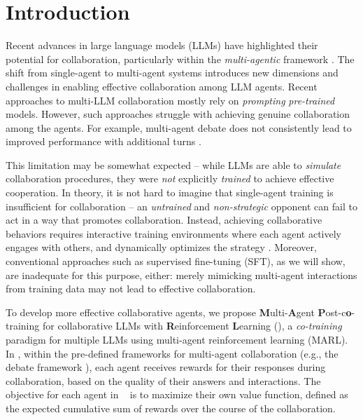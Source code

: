 \safevspace{-4mm}
\section{Introduction}




\safevspace{-2.2mm}
Recent advances in large language models (LLMs) have highlighted their potential for collaboration, particularly within the {\it multi-agentic} framework  \citep{du2023improving, li2023camel, kim2024adaptive}. The shift from single-agent to multi-agent systems introduces new dimensions and challenges in enabling effective collaboration among LLM agents. 
Recent approaches to  multi-LLM  collaboration mostly rely on 
{{\it prompting} {\it pre-trained} models. However,} such approaches struggle with achieving genuine collaboration among the agents. For example, multi-agent debate does not consistently lead to improved performance with additional turns \citep{huang2023large}.


\safevspace{-1.5mm}

This limitation may be somewhat expected -- while LLMs are able to {\it simulate} collaboration procedures, they were  {\it not} explicitly {\it trained} to achieve effective cooperation.
{In theory, it is not hard to imagine that single-agent training is insufficient for collaboration -- an {\it untrained} and {\it non-strategic} opponent can fail to act in a way that promotes  collaboration. 
Instead,} 
achieving collaborative behaviors requires interactive training environments where each agent actively engages with others, and dynamically optimizes the strategy \citep{gagne1974instruction,macy1991learning, hertz2013learning}. Moreover, conventional approaches such as supervised fine-tuning (SFT), as we will show, are inadequate for this purpose, either:  
merely mimicking multi-agent interactions from training data may not lead to effective collaboration. 

\safevspace{-1.5mm}

To develop more effective collaborative agents, we propose {\bf M}ulti-{\bf A}gent {\bf P}ost-c{\bf o}-training for collaborative LLMs with {\bf R}einforcement {\bf L}earning (\textbf{\ours}), a {\it co-training} paradigm for multiple LLMs using multi-agent reinforcement learning (MARL). In \ourstwo, within the  pre-defined frameworks for multi-agent collaboration ({e.g.}, the debate framework \citep{du2023improving}), each agent receives rewards for their responses during collaboration, based on the quality of their answers and interactions. The objective for each agent in  \ourstwo~ is to maximize their own value function, defined as the expected cumulative sum of rewards over the course of the collaboration.

